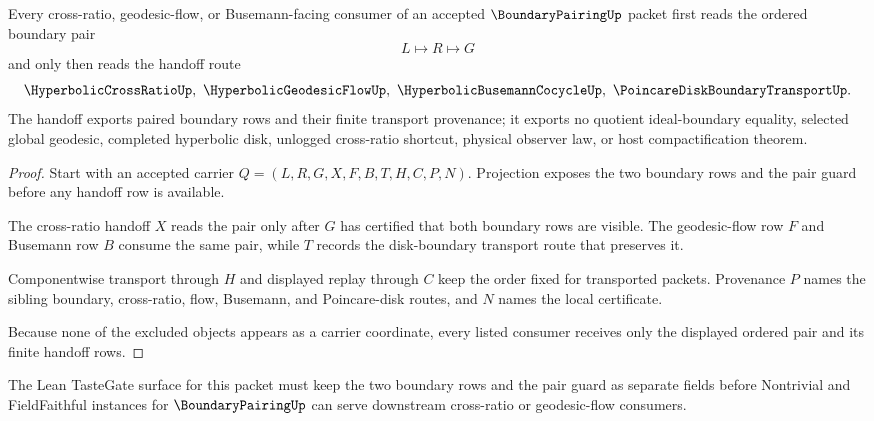 \begin{theorem}
\label{thm:boundary-pairing-cross-ratio-handoff}
Every cross-ratio, geodesic-flow, or Busemann-facing consumer of an accepted $\BoundaryPairingUp$ packet first reads the ordered boundary pair
$$
L \longmapsto R \longmapsto G
$$
and only then reads the handoff route
$$
\HyperbolicCrossRatioUp,\ \HyperbolicGeodesicFlowUp,\ \HyperbolicBusemannCocycleUp,\ \PoincareDiskBoundaryTransportUp .
$$
The handoff exports paired boundary rows and their finite transport provenance; it exports no quotient ideal-boundary equality, selected global geodesic, completed hyperbolic disk, unlogged cross-ratio shortcut, physical observer law, or host compactification theorem.
\end{theorem}
\begin{proof}
Start with an accepted carrier $Q=(L,R,G,X,F,B,T,H,C,P,N)$. Projection exposes the two boundary rows and the pair guard before any handoff row is available.

The cross-ratio handoff $X$ reads the pair only after $G$ has certified that both boundary rows are visible. The geodesic-flow row $F$ and Busemann row $B$ consume the same pair, while $T$ records the disk-boundary transport route that preserves it.

Componentwise transport through $H$ and displayed replay through $C$ keep the order fixed for transported packets. Provenance $P$ names the sibling boundary, cross-ratio, flow, Busemann, and Poincare-disk routes, and $N$ names the local certificate.

Because none of the excluded objects appears as a carrier coordinate, every listed consumer receives only the displayed ordered pair and its finite handoff rows.
\end{proof}



The Lean TasteGate surface for this packet must keep the two boundary rows and the pair guard as separate fields before Nontrivial and FieldFaithful instances for $\BoundaryPairingUp$ can serve downstream cross-ratio or geodesic-flow consumers.


